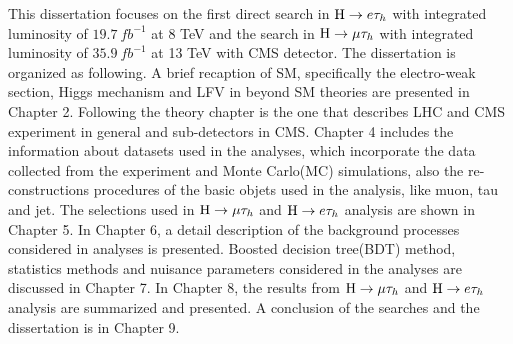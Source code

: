 This dissertation focuses on the first direct search in $\mathrm{H} \to e \tau_{h}$ with integrated luminosity of $19.7 ~fb^{-1}$ at 8 TeV and the search in $\mathrm{H}\to \mu\tau_{h}$ with integrated luminosity of $35.9~ fb^{-1}$ at 13 TeV with CMS detector. The dissertation is organized as following. A brief recaption of SM, specifically the electro-weak section, Higgs mechanism and LFV in beyond SM theories are presented in Chapter 2. Following the theory chapter is the one that describes LHC and CMS experiment in general and sub-detectors in CMS. Chapter 4 includes the information about datasets used in the analyses, which incorporate the data collected from the experiment and Monte Carlo(MC) simulations, also the re-constructions procedures of the basic objets used in the analysis, like muon, tau and jet. The selections used in $\mathrm{H}\to \mu\tau_{h}$ and $\mathrm{H} \to e \tau_{h}$ analysis are shown in Chapter 5. In Chapter 6, a detail description of the background processes considered in analyses is presented. Boosted decision tree(BDT) method, statistics methods and nuisance parameters considered in the analyses are discussed in Chapter 7. In Chapter 8, the results from $\mathrm{H}\to \mu\tau_{h}$ and $\mathrm{H} \to e \tau_{h}$ analysis are summarized and presented. A conclusion of the searches and the dissertation is in Chapter 9.





